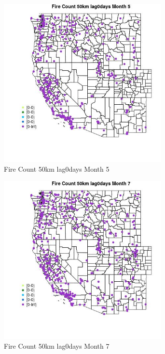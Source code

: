 \begin{figure} 
\centering  
\includegraphics[width=0.77\textwidth]{Code_Outputs/Report_ML_input_PM25_Step4_part_e_de_duplicated_aves_compiled_2019-05-18wNAs_MapObsMo5Fire_Count_50km_lag0days.jpg} 
\caption{\label{fig:Report_ML_input_PM25_Step4_part_e_de_duplicated_aves_compiled_2019-05-18wNAsMapObsMo5Fire_Count_50km_lag0days}Fire Count 50km lag0days Month 5} 
\end{figure} 
 

\begin{figure} 
\centering  
\includegraphics[width=0.77\textwidth]{Code_Outputs/Report_ML_input_PM25_Step4_part_e_de_duplicated_aves_compiled_2019-05-18wNAs_MapObsMo7Fire_Count_50km_lag0days.jpg} 
\caption{\label{fig:Report_ML_input_PM25_Step4_part_e_de_duplicated_aves_compiled_2019-05-18wNAsMapObsMo7Fire_Count_50km_lag0days}Fire Count 50km lag0days Month 7} 
\end{figure} 
 

